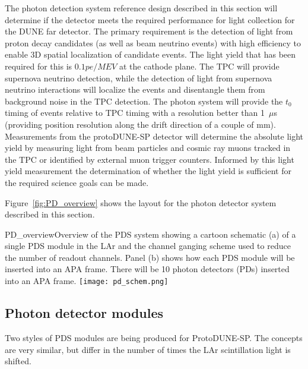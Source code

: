 The photon detection system reference design described in this section
will determine if the detector meets the required performance for 
light collection for the DUNE far detector. 
The primary requirement is the detection of light from proton decay
candidates (as well as beam neutrino events) with high efficiency to
enable 3D spatial localization of candidate events. The light yield that
has been required for this is $0.1pe/MEV$ at the cathode plane.
The TPC will provide supernova neutrino detection, while the detection of light
from supernova neutrino interactions will localize the events and disentangle
them from background noise in the TPC detection.
The photon system will provide the $t_0$ timing of
events relative to TPC timing with a resolution better than 1~$\mu$s
(providing position resolution along the drift direction of a couple of mm). 
Measurements from the protoDUNE-SP detector will determine the absolute
light yield by measuring light from beam particles and cosmic ray muons
tracked in the TPC or identified by external muon trigger counters.
Informed by this light yield measurement the determination of whether the 
light yield is sufficient for the required science goals can be made.

Figure~\ref{fig:PD_overview} shows the layout for the photon detector
system described in this section. %
\begin{cdrfigure}{PD_overview}{Overview of the PDS
    system showing a cartoon schematic (a) of a single PDS module
    in the LAr and the channel ganging scheme used to reduce the
    number of readout channels. Panel (b) shows how each PDS module
    will be inserted into an APA frame. There will be 10 photon detectors (PDs) inserted
    into an APA frame.}
\texttt{[image: pd\_schem.png]}
\end{cdrfigure}

\subsection{Photon detector modules}

Two styles of PDS %
modules are being produced for ProtoDUNE-SP.  
The concepts are very similar, but differ in the number of times the LAr scintillation 
light is shifted.  

